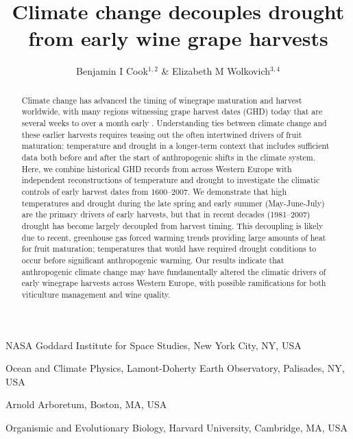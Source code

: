 \documentclass[final]{nature}
\title{Climate change decouples drought from early wine grape harvests}
\author{Benjamin I Cook$^{1,2}$ \& Elizabeth M Wolkovich$^{3,4}$}
\begin{document}
\maketitle

\begin{affiliations}
 \item NASA Goddard Institute for Space Studies, New York City, NY, USA
 \item Ocean and Climate Physics, Lamont-Doherty Earth Observatory, Palisades, NY, USA
 \item Arnold Arboretum, Boston, MA, USA
 \item Organismic and Evolutionary Biology, Harvard University, Cambridge, MA, USA
\end{affiliations}

\begin{abstract}
Climate change has advanced the timing of winegrape maturation and harvest worldwide, with many regions witnessing grape harvest dates (GHD) today that are several weeks to over a month early \cite{Duchene:2005bd,Seguin2005,webb2011}. Understanding ties between climate change and these earlier harvests requires teasing out the often intertwined drivers of fruit maturation: temperature and drought in a longer-term context that includes sufficient data both before and after the start of anthropogenic shifts in the climate system. Here, we combine historical GHD records from across Western Europe\cite{Daux2012} with independent reconstructions of temperature\cite{Luterbacher2004} and drought\cite{CookOWDA2015,Pauling2006} to investigate the climatic controls of early harvest dates from 1600--2007. We demonstrate that high temperatures and drought during the late spring and early summer (May-June-July) are the primary drivers of early harvests, but that in recent decades (1981--2007) drought has become largely decoupled from harvest timing. This decoupling is likely due to recent, greenhouse gas forced warming trends providing large amounts of heat for fruit maturation; temperatures that would have required drought conditions to occur before significant anthropogenic warming. Our results indicate that anthropogenic climate change may have fundamentally altered the climatic drivers of early winegrape harvests across Western Europe, with possible ramifications for both viticulture management and wine quality. %
\end{abstract}
\end{document}
